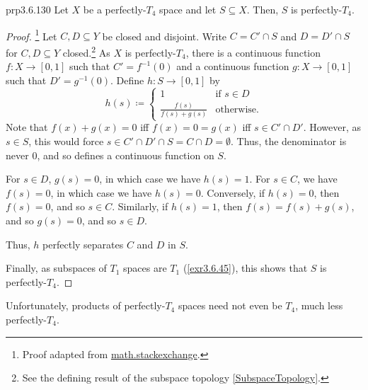\begin{prp}{}{prp3.6.130}
Let $X$ be a perfectly-$T_4$ space and let $S\subseteq X$.  Then, $S$ is perfectly-$T_4$.
\begin{proof}\footnote{Proof adapted from \href{http://math.stackexchange.com/questions/1840614/}{math.stackexchange}.}
Let $C,D\subseteq Y$ be closed and disjoint.  Write $C=C'\cap S$ and $D=D'\cap S$ for $C,D\subseteq Y$ closed.\footnote{See the defining result of the subspace topology \cref{SubspaceTopology}.}  As $X$ is perfectly-$T_4$, there is a continuous function $f\colon X\rightarrow [0,1]$ such that $C'=f^{-1}(0)$ and a continuous function $g\colon X\rightarrow [0,1]$ such that $D'=g^{-1}(0)$.  Define $h\colon S\rightarrow [0,1]$ by
\begin{equation}
h(s)\coloneqq \begin{cases}1 & \text{if }s\in D \\ \frac{f(s)}{f(s)+g(s)}& \text{otherwise.}\end{cases}
\end{equation}
Note that $f(x)+g(x)=0$ iff $f(x)=0=g(x)$ iff $s\in C'\cap D'$.  However, as $s\in S$, this would force $s\in C'\cap D'\cap S=C\cap D=\emptyset$.  Thus, the denominator is never $0$, and so defines a continuous function on $S$.

For $s\in D$, $g(s)=0$, in which case we have $h(s)=1$.  For $s\in C$, we have $f(s)=0$, in which case we have $h(s)=0$.  Conversely, if $h(s)=0$, then $f(s)=0$, and so $s\in C$.  Similarly, if $h(s)=1$, then $f(s)=f(s)+g(s)$, and so $g(s)=0$, and so $s\in D$.

Thus, $h$ perfectly separates $C$ and $D$ in $S$.

Finally, as subspaces of $T_1$ spaces are $T_1$ (\cref{exr3.6.45}), this shows that $S$ is perfectly-$T_4$.
\end{proof}
\end{prp}
Unfortunately, products of perfectly-$T_4$ spaces need not even be $T_4$, much less perfectly-$T_4$.
